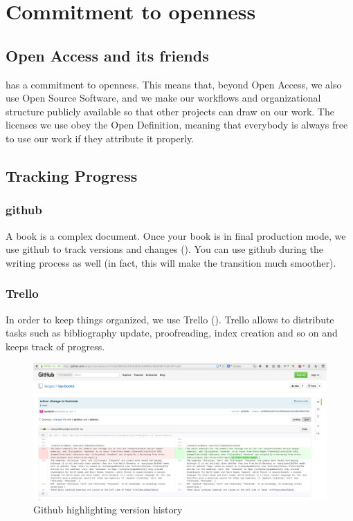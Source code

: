 \chapter{Commitment to openness}
\section{Open Access and its friends}
\lsp has a commitment to openness. This means that, beyond Open Access, we also use Open Source Software, and we make our workflows and organizational structure publicly available so that other projects can draw on our work. The licenses we use obey the Open Definition, meaning that everybody is always free to use our work if they attribute it properly.




\section{Tracking Progress}
\subsection{github}
A book is a complex document. Once your book is in final production mode, we use github to track versions and changes (). You can use github during the writing process as well (in fact, this will make the transition much smoother).

\subsection{Trello}
In order to keep things organized, we use Trello (). Trello allows to distribute tasks such as bibliography update, proofreading, index creation and so on and keeps track of progress.

\begin{figure}
\caption{Github highlighting version history}
\label{fig:latex:github}
 \includegraphics[width=\textwidth]{github.png}
\end{figure}

